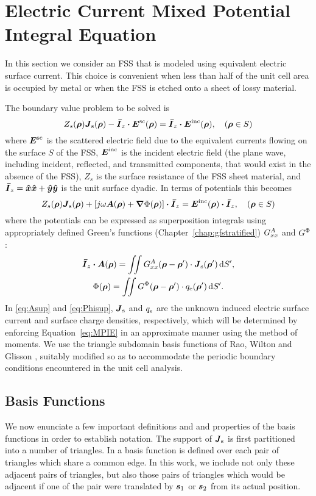 \section{Electric Current Mixed Potential Integral Equation}
In this section we consider an FSS that is modeled using equivalent
electric surface current.  This choice is convenient when less than
half of the unit cell area is occupied by metal or when the FSS is
etched onto a sheet of lossy material.

The boundary value problem to be solved is \cite{mitz:68}
\begin{equation}
  Z_s(\boldsymbol{\rho}) \boldsymbol{J}_{\text{s}}(\boldsymbol{\rho})  -\boldsymbol{\bar{I}}_z \boldsymbol{\cdot} \boldsymbol{E}^{\text{sc}}(\boldsymbol{\rho}) = 
  \boldsymbol{\bar{I}}_z \boldsymbol{\cdot} \boldsymbol{E}^{\text{inc}}(\boldsymbol{\rho}), \quad (\boldsymbol{\rho} \in S)
  \label{eq:EFIE}
\end{equation}
where $\boldsymbol{E}^{\text{sc}}$ is the scattered electric field due to the equivalent
currents flowing 
on the surface $S$ of the FSS, $\boldsymbol{E}^{\text{inc}}$ is the incident electric field
(the plane wave, including incident, reflected, and transmitted
components, that would exist in the absence of the FSS), $Z_s$ is the
surface resistance of the FSS sheet material,
and $\boldsymbol{\bar{I}}_z = \boldsymbol{\hat{x}}\boldsymbol{\hat{x}} + \boldsymbol{\hat{y}}\boldsymbol{\hat{y}}$ is the unit surface dyadic.  In
terms of potentials this becomes
\begin{equation}
  Z_s(\boldsymbol{\rho}) \boldsymbol{J}_{\text{s}}(\boldsymbol{\rho}) + [j\omega \boldsymbol{A}(\boldsymbol{\rho}) +
  \boldsymbol{\nabla}\Phi(\boldsymbol{\rho})] \boldsymbol{\cdot} \boldsymbol{\bar{I}}_z = 
  \boldsymbol{E}^{\text{inc}}(\boldsymbol{\rho}) \boldsymbol{\cdot} \boldsymbol{\bar{I}}_z, \quad (\boldsymbol{\rho} \in S)
  \label{eq:MPIE}
\end{equation}
where the potentials can be expressed as superposition integrals
using appropriately defined Green's functions 
(Chapter~\ref{chap:gfstratified})
$G^A_{xx}$ and ${G}^{\Phi}$:
\begin{gather}
  \boldsymbol{\bar{I}}_z \boldsymbol{\cdot} \boldsymbol{A}(\boldsymbol{\rho}) = 
  \iint G^A_{xx}(\boldsymbol{\rho}-\boldsymbol{\rho}') \cdot \boldsymbol{J}_{\text{s}}(\boldsymbol{\rho}') \, \text{d} S',
  \label{eq:Asup}\\
  \Phi(\boldsymbol{\rho}) = \iint {G}^{\Phi}(\boldsymbol{\rho}-\boldsymbol{\rho}') \cdot q_{\text{e}}(\boldsymbol{\rho}') \, \text{d} S'.
  \label{eq:Phisup}
\end{gather}
In \eqref{eq:Asup} and \eqref{eq:Phisup}, $\boldsymbol{J}_{\text{s}}$ and $q_{\text{e}}$ are the unknown
induced electric surface current and surface charge densities,
respectively, which will be determined
by enforcing
Equation~\eqref{eq:MPIE} in an approximate manner using the method of
moments.  We use the triangle subdomain basis functions of Rao, Wilton and
Glisson \cite{rawg:82}, suitably modified so as to accommodate the
periodic boundary conditions encountered in the unit cell analysis.


\subsection{Basis Functions}
\label{sec:bf}
We now enunciate a few important definitions and 
and properties of the basis functions in order to establish
notation.
The support of $\boldsymbol{J}_{\text{s}}$ is first partitioned into a number of triangles.
In \cite{rawg:82} a basis function is defined over each pair of triangles which share a common
edge.  In this work, we include not only these adjacent pairs of
triangles, but also those pairs of triangles which would be adjacent
if one of the pair were translated by $\boldsymbol{s}_1$ or $\boldsymbol{s}_2$ from its actual
position.

